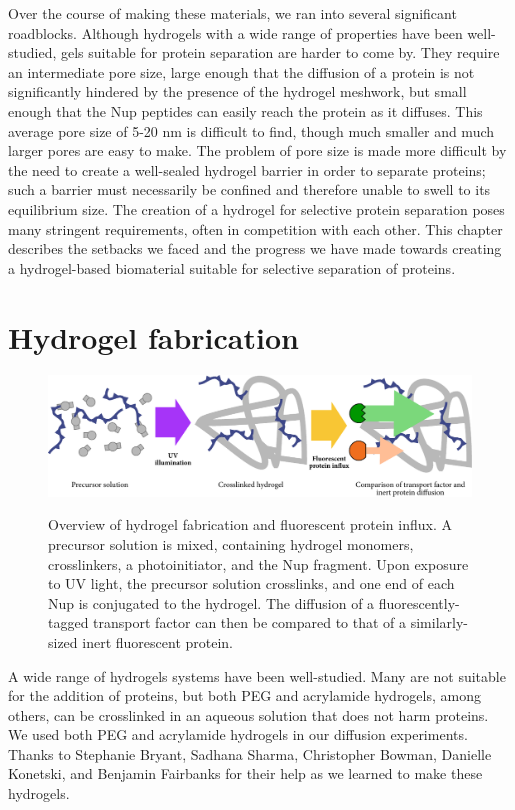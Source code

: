 Over the course of making these materials, we ran into several significant roadblocks.  Although hydrogels with a wide range of properties have been well-studied, gels suitable for protein separation are harder to come by.  They require an intermediate pore size, large enough that the diffusion of a protein is not significantly hindered by the presence of the hydrogel meshwork, but small enough that the Nup peptides can easily reach the protein as it diffuses.  This average pore size of 5-20 nm is difficult to find, though much smaller and much larger pores are easy to make.  The problem of pore size is made more difficult by the need to create a well-sealed hydrogel barrier in order to separate proteins; such a barrier must necessarily be confined and therefore unable to swell to its equilibrium size. The creation of a hydrogel for selective protein separation poses many stringent requirements, often in competition with each other.  This chapter describes the setbacks we faced and the progress we have made towards creating a hydrogel-based biomaterial suitable for selective separation of proteins.


\section{Hydrogel fabrication}
\label{sec:hydrogel-fabrication}

\begin{figure}
\caption[Hydrogels for protein separation.]{Overview of hydrogel fabrication and fluorescent protein influx. A precursor solution is mixed, containing hydrogel monomers, crosslinkers, a photoinitiator, and the Nup fragment.  Upon exposure to UV light, the precursor solution crosslinks, and one end of each Nup is conjugated to the hydrogel.  The diffusion of a fluorescently-tagged transport factor can then be compared to that of a similarly-sized inert fluorescent protein.}
\centering
\includegraphics[width=\textwidth]{figs/ch03/precursor}
\label{fig:precursor}
\end{figure}

A wide range of hydrogels systems have been well-studied.  Many are not suitable for the addition of proteins, but both PEG and acrylamide hydrogels, among others, can be crosslinked in an aqueous solution that does not harm proteins.  We used both PEG and acrylamide hydrogels in our diffusion experiments.  Thanks to Stephanie Bryant, Sadhana Sharma, Christopher Bowman, Danielle Konetski, and Benjamin Fairbanks for their help as we learned to make these hydrogels.


